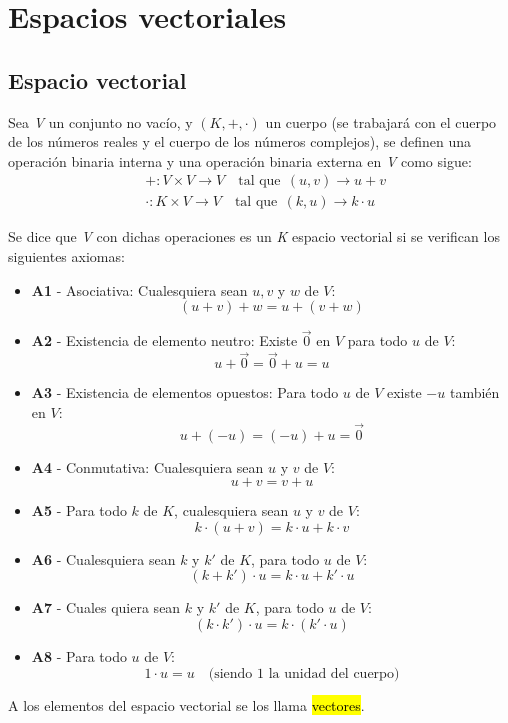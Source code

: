 \section{Espacios vectoriales}

\subsection{Espacio vectorial}

Sea \textit{V} un conjunto no vacío, y \(\left(K, +, \cdot\right)\) un cuerpo (se trabajará con el cuerpo de los números reales y el cuerpo de los números complejos), se definen una operación binaria interna y una operación binaria externa en \textit{V} como sigue:
\begin{align*}
  &+: V \times V \rightarrow V \quad \text{tal que}~~ (u,v) \rightarrow u+v \\
  &\cdot : K \times V \rightarrow V \quad \text{tal que}~~ (k,u) \rightarrow k\cdot u
\end{align*}

Se dice que \textit{V} con dichas operaciones es un \textit{K} espacio vectorial si se verifican los siguientes axiomas:
\begin{itemize}
  \item \textbf{A1} - Asociativa: Cualesquiera sean \(u,v\) y \(w\) de \(V\): \[
    (u+v)+w = u + (v+w)
  \]
  \item \textbf{A2} - Existencia de elemento neutro: Existe \(\vec{0}\) en \(V\) para todo \(u\) de \(V\):\[
    u+\vec{0}=\vec{0}+u = u
  \]
  \item \textbf{A3} - Existencia de elementos opuestos: Para todo \(u\) de \(V\) existe \(-u\) también en \(V\):\[
    u + (-u) = (-u) + u = \vec{0}
  \]
  \item \textbf{A4} - Conmutativa: Cualesquiera sean \(u\) y \(v\) de \(V\): \[
    u + v = v + u
  \]
  \item \textbf{A5} - Para todo \(k\) de \(K\), cualesquiera sean \(u\) y \(v\) de \(V\): \[
    k\cdot (u+v)=k\cdot u+k\cdot v
  \]
  \item \textbf{A6} - Cualesquiera sean \(k\) y \(k'\) de \(K\), para todo \(u\) de \(V\):\[
    (k + k')\cdot u = k \cdot u + k' \cdot u
  \]
  \item \textbf{A7} - Cuales quiera sean \(k\) y \(k'\) de \(K\), para todo \(u\) de \(V\):\[
    (k\cdot k')\cdot u = k \cdot (k' \cdot u)
  \]
  \item \textbf{A8} - Para todo \(u\) de \(V\): \[
    1 \cdot u = u \quad \text{(siendo 1 la unidad del cuerpo)}
  \]
\end{itemize}
A los elementos del espacio vectorial se los llama \hl{vectores}.

